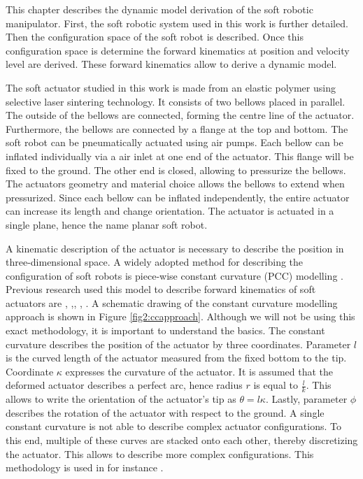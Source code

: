 \label{chap2}

This chapter describes the dynamic model derivation of the soft robotic manipulator. First, the soft robotic system used in this work is further detailed. Then the configuration space of the soft robot is described. Once this configuration space is determine the forward kinematics at position and velocity level are derived. These forward kinematics allow to derive a dynamic model. 



The soft actuator studied in this work is made from an elastic polymer using selective laser sintering technology. It consists of two bellows placed in parallel. The outside of the bellows are connected, forming the centre line of the actuator. Furthermore, the bellows are connected by a flange at the top and bottom. The soft robot can be pneumatically actuated using air pumps. Each bellow can be inflated individually via a air inlet at one end of the actuator. This flange will be fixed to the ground. The other end is closed, allowing to pressurize the bellows. The actuators geometry and material choice allows the bellows to extend when pressurized. Since each bellow can be inflated independently, the entire actuator can increase its length and change orientation. The actuator is actuated in a single plane, hence the name planar soft robot. 

A kinematic description of the actuator is necessary to describe the position in three-dimensional space. A widely adopted method for describing the configuration of soft robots is piece-wise constant curvature (PCC) modelling \cite{ccapproach}. Previous research used this model to describe forward kinematics of soft actuators are \cite{mahl2014bhakin}, \cite{berkers},\cite{Falkenhahn2015}, \cite{ccapproach}, \cite{runge2017framework}. A schematic drawing of the constant curvature modelling approach is shown in Figure \ref{fig2:ccapproach}. Although we will not be using this exact methodology, it is important to understand the basics. The constant curvature describes the position of the actuator by three coordinates. Parameter $l$ is the curved length of the actuator measured from the fixed bottom to the tip. Coordinate $\kappa$ expresses the curvature of the actuator. It is assumed that the deformed actuator describes a perfect arc, hence radius $r$ is equal to $\frac{l}{k}$. This allows to write the orientation of the actuator's tip as $\theta = l\kappa$. Lastly, parameter $\phi$ describes the rotation of the actuator with respect to the ground. A single constant curvature is not able to describe complex actuator configurations. To this end, multiple of these curves are stacked onto each other, thereby discretizing the actuator. This allows to describe more complex configurations. This methodology is used in for instance \cite{Falkenhahn2015}.

